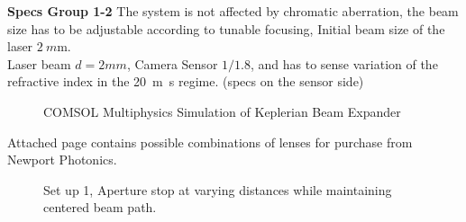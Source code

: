 \documentclass[main.tex]{subfiles}
\begin{document}
\textbf{Specs Group 1-2} The system is not affected by chromatic aberration, the beam size has to be adjustable according to tunable focusing, Initial beam size of the laser $\SI{2}{m\metre}$.\\

Laser beam $d=2mm$, Camera Sensor $1/1.8$, and has to sense variation of the refractive index in the \SI{20}{m\second} regime. (specs on the sensor side)\\

\begin{figure}\label{fig:2}
\centering{}
\caption{COMSOL Multiphysics Simulation of Keplerian Beam Expander}
\end{figure}

Attached page contains possible combinations of lenses for purchase from Newport Photonics.


\begin{figure}\label{fig:3}
\centering{}
\centering{}
\caption{Set up 1, Aperture stop at varying distances while maintaining centered beam path.}
\end{figure}
\end{document}
